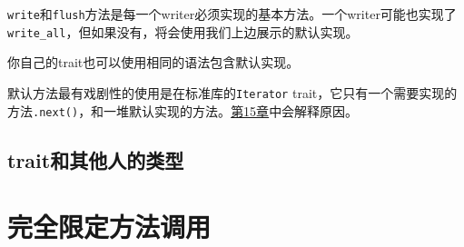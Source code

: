 \texttt{write}和\texttt{flush}方法是每一个writer必须实现的基本方法。一个writer可能也实现了\texttt{write\_all}，但如果没有，将会使用我们上边展示的默认实现。

你自己的trait也可以使用相同的语法包含默认实现。

默认方法最有戏剧性的使用是在标准库的\texttt{Iterator} trait，它只有一个需要实现的方法\texttt{.next()}，和一堆默认实现的方法。\hyperref[ch15]{第15章}中会解释原因。

\subsection{trait和其他人的类型}

\section{完全限定方法调用}\label{fullymethod}

